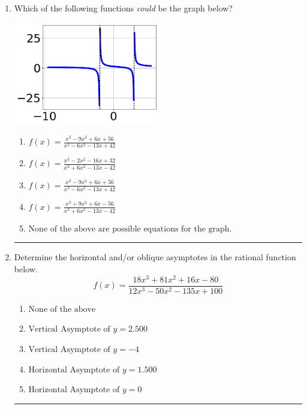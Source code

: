 \documentclass[14pt]{extbook}
\newcommand{\litem}[1]{\item#1\hspace*{-1cm}\rule{\textwidth}{0.4pt}}
\begin{document}
\begin{enumerate}
{\begin{enumerate}[label=\Alph*.]
\end{enumerate} }
\litem{
Which of the following functions \textit{could} be the graph below?
\begin{center}
    \includegraphics[width=0.5\textwidth]{../Figures/identifyGraphOfRationalFunctionC.png}
\end{center}
\begin{enumerate}[label=\Alph*.]
\item \( f(x)=\frac{x^{3} -9 x^{2} +6 x + 56}{x^{3} -6 x^{2} -13 x + 42} \)
\item \( f(x)=\frac{x^{3} -2 x^{2} -16 x + 32}{x^{3} +6 x^{2} -13 x -42} \)
\item \( f(x)=\frac{x^{3} -9 x^{2} +6 x + 56}{x^{3} -6 x^{2} -13 x + 42} \)
\item \( f(x)=\frac{x^{3} +9 x^{2} +6 x -56}{x^{3} +6 x^{2} -13 x -42} \)
\item \( \text{None of the above are possible equations for the graph.} \)

\end{enumerate} }
\litem{
Determine the horizontal and/or oblique asymptotes in the rational function below.\[ f(x) = \frac{18x^{3} +81 x^{2} +16 x -80}{12x^{3} -50 x^{2} -135 x + 100} \]\begin{enumerate}[label=\Alph*.]
\item \( \text{None of the above} \)
\item \( \text{Vertical Asymptote of } y = 2.500  \)
\item \( \text{Vertical Asymptote of } y = -4  \)
\item \( \text{Horizontal Asymptote of } y = 1.500  \)
\item \( \text{Horizontal Asymptote of } y = 0  \)

\end{enumerate} }
\end{enumerate}
\end{document}
